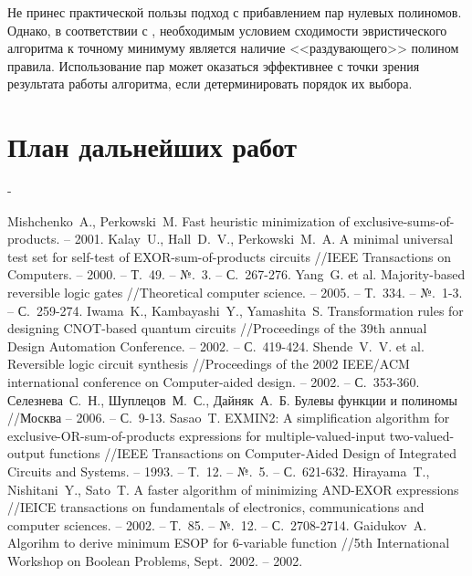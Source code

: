 \documentclass[a4paper,12pt,titlepage,finall]{article}
\begin{document}
Не принес практической пользы подход с прибавлением пар нулевых полиномов. Однако, в соответствии с \cite{convergence}, необходимым условием сходимости эвристического алгоритма к точному минимуму является наличие <<раздувающего>> полином правила. Использование пар может оказаться эффективнее с точки зрения результата работы алгоритма, если детерминировать порядок их выбора.

\newpage

\section{План дальнейших работ}

-

\newpage

\begin{raggedright}
\begin{thebibliography}{99}
     Mishchenko~A., Perkowski~M. Fast heuristic minimization of exclusive-sums-of-products. – 2001.
     Kalay~U., Hall~D.~V., Perkowski~M.~A. A minimal universal test set for self-test of EXOR-sum-of-products circuits //IEEE Transactions on Computers. – 2000. – Т.~49. – №.~3. – С.~267-276.
     Yang~G. et al. Majority-based reversible logic gates //Theoretical computer science. – 2005. – Т.~334. – №.~1-3. – С.~259-274.
     Iwama~K., Kambayashi~Y., Yamashita~S. Transformation rules for designing CNOT-based quantum circuits //Proceedings of the 39th annual Design Automation Conference. – 2002. – С.~419-424.
     Shende~V.~V. et al. Reversible logic circuit synthesis //Proceedings of the 2002 IEEE/ACM international conference on Computer-aided design. – 2002. – С.~353-360.
     Селезнева~С.~Н., Шуплецов~М.~С., Дайняк~А.~Б. Булевы функции и полиномы //Москва – 2006. – С.~9-13.
     Sasao~T. EXMIN2: A simplification algorithm for exclusive-OR-sum-of-products expressions for multiple-valued-input two-valued-output functions //IEEE Transactions on Computer-Aided Design of Integrated Circuits and Systems. – 1993. – Т.~12. – №.~5. – С.~621-632.
     Hirayama~T., Nishitani~Y., Sato~T. A faster algorithm of minimizing AND-EXOR expressions //IEICE transactions on fundamentals of electronics, communications and computer sciences. – 2002. – Т.~85. – №.~12. – С.~2708-2714.
     Gaidukov~A. Algorihm to derive minimum ESOP for 6-variable function //5th International Workshop on Boolean Problems, Sept.~2002. – 2002.

\end{thebibliography}
\end{raggedright}
\end{document}
